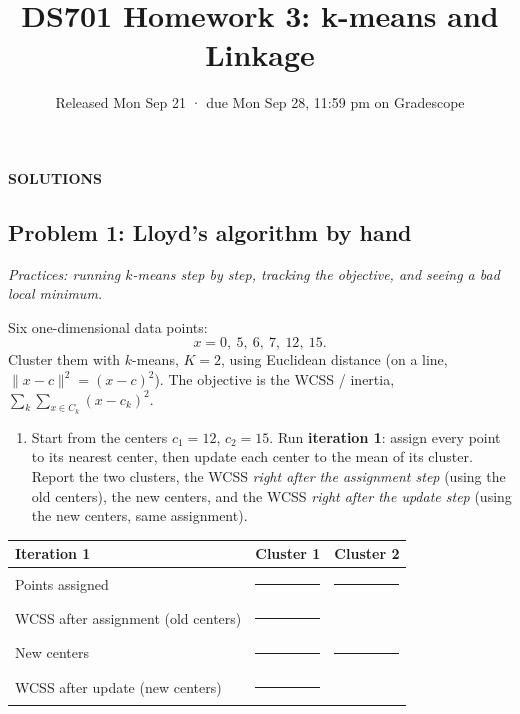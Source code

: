 \documentclass[
  11pt,
]{article}
\title{DS701 Homework 3: k-means and Linkage}
\subtitle{Released Mon Sep 21 · due Mon Sep 28, 11:59 pm on Gradescope}
\author{}
\date{}
\newcounter{none} %
\providecommand{\tightlist}{%
  \setlength{\itemsep}{0pt}\setlength{\parskip}{0pt}}
\newcommand{\answerspace}[1]{\par\vspace*{#1}}  %
\newcommand{\blank}[1][1.2in]{\rule{#1}{0.4pt}}
\newcommand{\answerpage}{\clearpage}
\begin{document}
\maketitle


\begin{center}\LARGE\bfseries\color{blue!45!black} SOLUTIONS\end{center}
\renewcommand{\answerspace}[1]{}
\renewcommand{\answerpage}{\par\vspace{6pt}}

\subsection{Problem 1: Lloyd's algorithm by
hand}\label{problem-1-lloyds-algorithm-by-hand}

\emph{Practices: running \(k\)-means step by step, tracking the
objective, and seeing a bad local minimum.}

Six one-dimensional data points: \[x = 0,\ 5,\ 6,\ 7,\ 12,\ 15 .\]
Cluster them with \(k\)-means, \(K = 2\), using Euclidean distance (on a
line, \(\|x-c\|^2 = (x-c)^2\)). The objective is the WCSS / inertia,
\(\sum_k \sum_{x\in C_k}(x-c_k)^2\).

\begin{enumerate}
\def\labelenumi{(\alph{enumi})}
\tightlist
\item
  Start from the centers \(c_1 = 12\), \(c_2 = 15\). Run
  \textbf{iteration 1}: assign every point to its nearest center, then
  update each center to the mean of its cluster. Report the two
  clusters, the WCSS \emph{right after the assignment step} (using the
  old centers), the new centers, and the WCSS \emph{right after the
  update step} (using the new centers, same assignment).
\end{enumerate}

{\def\LTcaptype{none} %
\begin{longtable}[]{@{}lll@{}}
\toprule\noalign{}
Iteration 1 & Cluster 1 & Cluster 2 \\
\midrule\noalign{}
\endhead
\bottomrule\noalign{}
\endlastfoot
Points assigned & \blank[1.6in] & \blank[1.6in] \\
WCSS after assignment (old centers) & \blank[1.6in] & \\
New centers & \blank[1.6in] & \blank[1.6in] \\
WCSS after update (new centers) & \blank[1.6in] & \\
\end{longtable}
}
\end{document}
